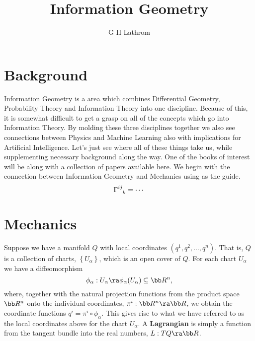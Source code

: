 \documentclass[12pt,letterpaper]{article}
\title{Information Geometry}
\author{G H Lathrom}
\begin{document}
\maketitle



\pagestyle{fancy}
\fancyhf{}
\chead{}
\fancyfoot[C]{\thepage}
\renewcommand{\headrulewidth}{.5pt}

\section{Background}

Information Geometry is a area which combines Differential Geometry, Probability Theory and Information Theory into one discipline.  
Because of this, it is somewhat difficult to get a grasp on all of the concepts which go into Information Theory.  
By molding these three disciplines together we also see connections between Physics and Machine Learning also with implications for Artificial Intelligence.
Let's just see where all of these things take us, while supplementing necessary background along the way.
One of the books of interest will be \cite{dodson} along with a collection of papers available \href{https://mega.nz/folder/5w0CDDzR\#EUMxMbyRJdNSKsqKIuEyFg}{here}.
We begin with the connection between Information Geometry and Mechanics using \cite{leok1} as the guide.
\begin{equation*}
    \tensor{\Gamma}{^{ij}_{k}} = \cdots
\end{equation*}

\section{Mechanics}

Suppose we have a manifold $Q$ with local coordinates $(q^1,q^2,\ldots,q^n)$.
That is, $Q$ is a collection of charts, $\left\{ U_\alpha \right\}$, which is an open cover of $Q$.  
For each chart $U_\alpha$ we have a diffeomorphism 
\begin{equation*}
    \phi_\alpha:U_\alpha \ra \phi_\alpha(U_\alpha) \subseteq \bb R^n, 
\end{equation*}
where, together with the natural projection functions from the product space $\bb R^n$ onto the individual coordinates, $\pi^i :\bb R^n \ra \bb R$,  we obtain the coordinate functions $q^i = \pi^i \circ \phi_\alpha$.
This gives rise to what we have referred to as the local coordinates above for the chart $U_\alpha$.  
A \textbf{Lagrangian} is simply a function from the tangent bundle into the real numbers, $L:TQ \ra \bb R$.



\end{document}
